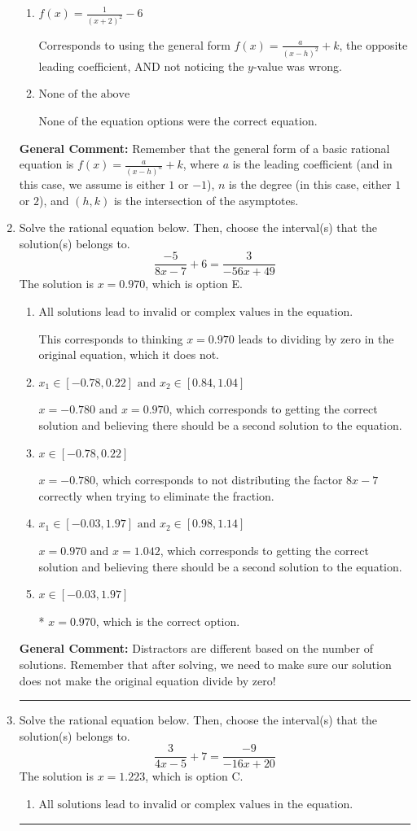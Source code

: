 \documentclass{extbook}[14pt]
\newcommand{\litem}[1]{\item #1

\rule{\textwidth}{0.4pt}}
\begin{document}
\begin{enumerate}
{\begin{enumerate}[label=\Alph*.]
The $x$- and $y$-value of the equation does not match the graph.
\item \( f(x) = \frac{1}{(x + 2)^2} - 6 \)

Corresponds to using the general form $f(x) = \frac{a}{(x-h)^2}+k$, the opposite leading coefficient, AND not noticing the $y$-value was wrong.
\item \( \text{None of the above} \)

None of the equation options were the correct equation.
\end{enumerate}

\textbf{General Comment:} Remember that the general form of a basic rational equation is $ f(x) = \frac{a}{(x-h)^n} + k$, where $a$ is the leading coefficient (and in this case, we assume is either $1$ or $-1$), $n$ is the degree (in this case, either $1$ or $2$), and $(h, k)$ is the intersection of the asymptotes.
}
\litem{
Solve the rational equation below. Then, choose the interval(s) that the solution(s) belongs to.
\[ \frac{-5}{8x -7} + 6 = \frac{3}{-56x + 49} \]The solution is \( x = 0.970 \), which is option E.\begin{enumerate}[label=\Alph*.]
\item \( \text{All solutions lead to invalid or complex values in the equation.} \)

This corresponds to thinking $x = 0.970$ leads to dividing by zero in the original equation, which it does not.
\item \( x_1 \in [-0.78, 0.22] \text{ and } x_2 \in [0.84,1.04] \)

$x = -0.780 \text{ and } x = 0.970$, which corresponds to getting the correct solution and believing there should be a second solution to the equation.
\item \( x \in [-0.78,0.22] \)

$x = -0.780$, which corresponds to not distributing the factor $8x -7$ correctly when trying to eliminate the fraction.
\item \( x_1 \in [-0.03, 1.97] \text{ and } x_2 \in [0.98,1.14] \)

$x = 0.970 \text{ and } x = 1.042$, which corresponds to getting the correct solution and believing there should be a second solution to the equation.
\item \( x \in [-0.03,1.97] \)

* $x = 0.970$, which is the correct option.
\end{enumerate}

\textbf{General Comment:} Distractors are different based on the number of solutions. Remember that after solving, we need to make sure our solution does not make the original equation divide by zero!
}
\litem{
Solve the rational equation below. Then, choose the interval(s) that the solution(s) belongs to.
\[ \frac{3}{4x -5} + 7 = \frac{-9}{-16x + 20} \]The solution is \( x = 1.223 \), which is option C.\begin{enumerate}[label=\Alph*.]
\item \( \text{All solutions lead to invalid or complex values in the equation.} \)


\end{enumerate}}
\end{enumerate}
\end{document}
